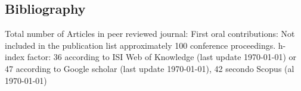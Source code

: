 \subsection*{Bibliography}
\nocite{*}
Total number of  Articles in peer reviewed journal:
\printbibliography[env=counter,heading=counter, type=article,
resetnumbers=true]  \hfill \break
First oral contributions:   \printbibliography[env=counter,heading=counter, type=misc, resetnumbers=true]  \hfill \break
Not included in the publication list approximately 100 conference
proceedings. \hfill \break
h-index factor: 36 according to ISI Web of Knowledge (last update \today) or 47 according to Google scholar (last update \today),   42 secondo Scopus (al \today)

\printbibliography[type=article, title={Article in peer-review journal}, heading=subbibliography, resetnumbers=true]
\printbibliography[type=misc, title={First author oral contribution}, heading=subbibliography, resetnumbers=true]
